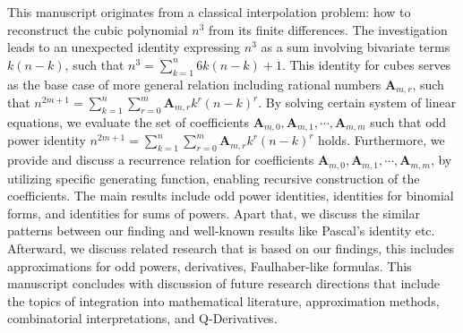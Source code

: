 This manuscript originates from a classical interpolation problem: how to reconstruct the cubic polynomial $n^3$
from its finite differences.
The investigation leads to an unexpected identity expressing $n^3$ as a sum involving bivariate terms $k(n-k)$,
such that $n^3=\sum_{k=1}^{n} 6k(n-k) + 1$.
This identity for cubes serves as the base case of more general relation
including rational numbers $\mathbf{A}_{m,r}$, such that
$n^{2m+1} = \sum_{k=1}^{n} \sum_{r=0}^{m} \mathbf{A}_{m,r} k^r (n-k)^r$.
By solving certain system of linear equations,
we evaluate the set of coefficients $\mathbf{A}_{m,0}, \mathbf{A}_{m,1}, \cdots, \mathbf{A}_{m,m}$ such that
odd power identity $n^{2m+1} = \sum_{k=1}^{n} \sum_{r=0}^{m} \mathbf{A}_{m,r} k^r (n-k)^r$ holds.
Furthermore, we provide and discuss a recurrence relation
for coefficients $\mathbf{A}_{m,0}, \mathbf{A}_{m,1}, \cdots, \mathbf{A}_{m,m}$, by utilizing
specific generating function, enabling recursive construction of the coefficients.
The main results include odd power identities, identities for binomial forms,
and identities for sums of powers.
Apart that, we discuss the similar patterns between our finding and well-known results like Pascal's identity etc.
Afterward, we discuss related research that is based on our findings, this includes approximations for odd powers,
derivatives, Faulhaber-like formulas.
This manuscript concludes with discussion of future research directions that include
the topics of integration into mathematical literature, approximation methods, combinatorial interpretations,
and Q-Derivatives.
